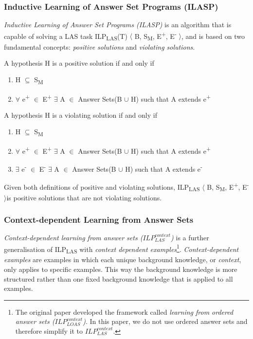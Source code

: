 \documentclass[11pt,twoside]{report}
\theoremstyle{plain}
\theoremstyle{definition}
\begin{document}
\subsubsection{Inductive Learning of Answer Set Programs (ILASP)}

\textit{Inductive Learning of Answer Set Programs (ILASP)} is an algorithm that is capable of solving a LAS task ILP\textsubscript{LAS}(T) $\langle$ B, S\textsubscript{M}, E\textsuperscript{+}, E\textsuperscript{-} $\rangle$, 
and is based on two fundamental concepts: \textit{positive solutions} and \textit{violating solutions}.

A hypothesis H is a positive solution if and only if
\begin{enumerate}
\item H $\subseteq$ S\textsubscript{M}
\item $\forall$ e\textsuperscript{+} $\in$ E\textsuperscript{+} $\exists$ A $\in$ Answer Sets(B $\cup$ H) such that A extends e\textsuperscript{+}
\end{enumerate}
A hypothesis H is a violating solution if and only if
\begin{enumerate}
\item H $\subseteq$ S\textsubscript{M}
\item $\forall$ e\textsuperscript{+} $\in$ E\textsuperscript{+} $\exists$ A $\in$ Answer Sets(B $\cup$ H) such that A extends e\textsuperscript{+}
\item $\exists$ e\textsuperscript{-} $\in$ E\textsuperscript{-} $\exists$ A $\in$ Answer Sets(B $\cup$ H) such that A extends e\textsuperscript{-}\\
\end{enumerate}

Given both definitions of positive and violating solutions, ILP\textsubscript{LAS} $\langle$ B, S\textsubscript{M}, E\textsuperscript{+}, E\textsuperscript{-} $\rangle$is positive solutions that are not violating solutions.

\subsubsection{Context-dependent Learning from Answer Sets }
\textit{Context-dependent learning from answer sets ($ILP_{LAS}^{context}$)} is a further generalisation of ILP\textsubscript{LAS} with \textit{context dependent examples}\cite{Law2016}\footnote{The original paper developed the framework called \textit{learning from ordered answer sets ($ILP_{LOAS}^{context}$)}. 
In this paper, we do not use ordered answer sets and therefore simplify it to $ILP_{LAS}^{context}$. }.
\textit{Context-dependent examples} are examples in which each unique background knowledge, or \textit{context}, only applies to specific examples. 
This way the background knowledge is more structured rather than one fixed background knowledge that is applied to all examples.
\end{document}
